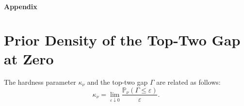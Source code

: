 \documentclass[10pt]{article}
\theoremstyle{plain}
\begin{document}
\newpage
\appendix
\noindent
{\Large{\textbf{Appendix}}}
\section{Prior Density of the Top-Two Gap at Zero} \label{pf:lem:top-gap-density}  


\begin{lemma}
\label{lem:top-gap-density}
The hardness parameter $\kappa_\nu$ and the top-two gap $\Gamma$ are related as follows:
\[
    \kappa_\nu
    =
    \lim_{\varepsilon\downarrow0}
    \frac{\mathbb P_\nu(\Gamma\le \varepsilon)}{\varepsilon}.
\]
\end{lemma}
\end{document}

